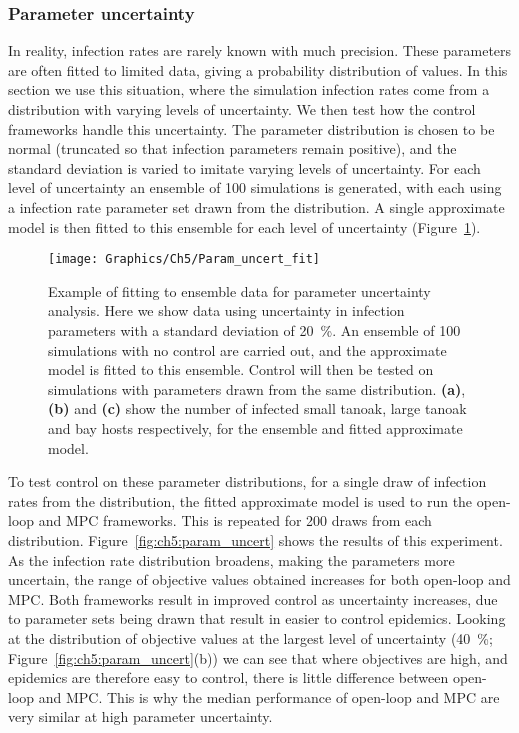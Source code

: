 \subsubsection{Parameter uncertainty}

In reality, infection rates are rarely known with much precision. These parameters are often fitted to limited data, giving a probability distribution of values. In this section we use this situation, where the simulation infection rates come from a distribution with varying levels of uncertainty. We then test how the control frameworks handle this uncertainty. The parameter distribution is chosen to be normal (truncated so that infection parameters remain positive), and the standard deviation is varied to imitate varying levels of uncertainty. For each level of uncertainty an ensemble of 100 simulations is generated, with each using a infection rate parameter set drawn from the distribution. A single approximate model is then fitted to this ensemble for each level of uncertainty (Figure~\ref{fig:ch5:param_uncert_fit}).

\begin{figure}
    \begin{center}
        \texttt{[image: Graphics/Ch5/Param\_uncert\_fit]}
        \caption[Ensemble fitting under parameter uncertainty]{Example of fitting to ensemble data for parameter uncertainty analysis. Here we show data using uncertainty in infection parameters with a standard deviation of \SI{20}{\percent}. An ensemble of 100 simulations with no control are carried out, and the approximate model is fitted to this ensemble. Control will then be tested on simulations with parameters drawn from the same distribution. \textbf{(a)}, \textbf{(b)} and \textbf{(c)} show the number of infected small tanoak, large tanoak and bay hosts respectively, for the ensemble and fitted approximate model.\label{fig:ch5:param_uncert_fit}}
    \end{center}
\end{figure}

To test control on these parameter distributions, for a single draw of infection rates from the distribution, the fitted approximate model is used to run the open-loop and MPC frameworks. This is repeated for 200 draws from each distribution. Figure~\ref{fig:ch5:param_uncert} shows the results of this experiment. As the infection rate distribution broadens, making the parameters more uncertain, the range of objective values obtained increases for both open-loop and MPC\@. Both frameworks result in improved control as uncertainty increases, due to parameter sets being drawn that result in easier to control epidemics. Looking at the distribution of objective values at the largest level of uncertainty (\SI{40}{\percent}; Figure~\ref{fig:ch5:param_uncert}(b)) we can see that where objectives are high, and epidemics are therefore easy to control, there is little difference between open-loop and MPC\@. This is why the median performance of open-loop and MPC are very similar at high parameter uncertainty.

